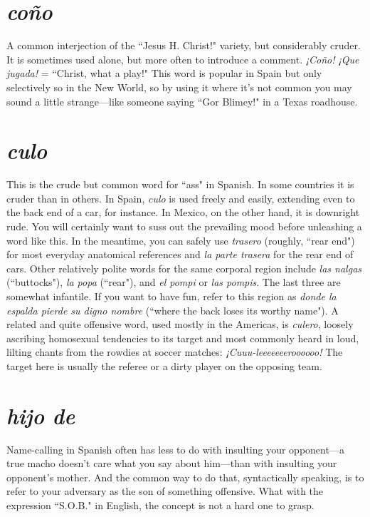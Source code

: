 \section{\emph{coño}}

A common interjection of the ``Jesus H. Christ!" variety, but
considerably cruder. It is sometimes used alone, but more often to introduce a comment. \emph{¡Coño! ¡Que jugada!} = ``Christ, what a play!"
This word is popular in Spain but only selectively so in the New
World, so by using it where it's not common you may sound a little
strange---like someone saying ``Gor Blimey!" in a Texas roadhouse.

\section{\emph{culo}}

This is the crude but common word for ``ass" in Spanish. In
some countries it is cruder than in others. In Spain, \emph{culo} is used freely
and easily, extending even to the back end of a car, for instance. In
Mexico, on the other hand, it is downright rude. You will certainly
want to suss out the prevailing mood before unleashing a word like
this. In the meantime, you can safely use \emph{trasero} (roughly, ``rear end")
for most everyday anatomical references and \emph{la parte trasera} for the
rear end of cars. Other relatively polite words for the same corporal region include \emph{las nalgas} (``buttocks"), \emph{la popa} (``rear"), and \emph{el pompi} or
\emph{las pompis}. The last three are somewhat infantile. If you want to have
fun, refer to this region as \emph{donde la espalda pierde su digno nombre}
(``where the back loses its worthy name").
A related and quite offensive word, used mostly in the Americas, is \emph{culero}, loosely ascribing homosexual tendencies to its target
and most commonly heard in loud, lilting chants from the rowdies at
soccer matches: \emph{¡Cuuu-leeeeeeeroooooo!} The target here is usually the
referee or a dirty player on the opposing team.

\section{\emph{hijo de}}

Name-calling in Spanish often has less to do with insulting
your opponent---a true macho doesn't care what you say about him---than with insulting your opponent's mother. And the common way to
do that, syntactically speaking, is to refer to your adversary as the son
of something offensive. What with the expression ``S.O.B." in English,
the concept is not a hard one to grasp.

